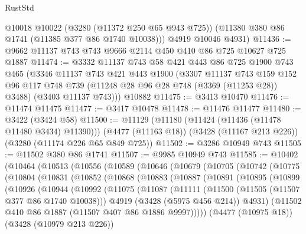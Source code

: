 \begin{lexlean}{RustStd}
\begin{coremodule}
        @10018
        @10022
        (@3280 (@11372 @250 @65 @943 @725))
        (@11380 @380 @86 @1741 (@11385 @377 @86 @1740 @10038)))
      @4919
      @10046
      @4931)
@11436 := @9662 @11137 @743 @743 @9666 @2114 @450 @410 @86 @725 @10627 @725 @1887
@11474 := @3332
    @11137
    @743
    @58
    @421
    @443
    @86
    @725
    @1900
    @743
    @465
    (@3346
      @11137
      @743
      @421
      @443
      @1900
      (@3307
        @11137
        @743
        @159
        @152
        @96
        @117
        @748
        @739
        (@11248 @28 @96 @28 @748 (@3369 (@11253 @28)) @3488)
        (@3403 @11137 @743)))
    @10882
@11475 := @3413 @10470
@11476 := @11474 @11475
@11477 := @3417 @10478
@11478 := @11476 @11477
@11480 := @3422 (@3424 @58)
@11500 := @11129
    (@11180 (@11424 (@11436 (@11478 @11480 @3434) @11390)))
    (@4477 (@11163 @18))
    (@3428 (@11167 @213 @226))
    (@3280 (@11174 @226 @65 @849 @725))
@11502 := @3286 @10949 @743
@11505 := @11502 @380 @86 @1741
@11507 := @9985 @10949 @743
@11585 := @10402
    (@10464
      (@10513
        (@10556
          (@10589
            (@10646
              (@10679
                (@10705
                  (@10742
                    (@10775
                      (@10804
                        (@10831
                          (@10852
                            (@10868
                              (@10883
                                (@10887
                                  (@10891
                                    (@10895
                                      (@10899
                                        (@10926
                                          (@10944
                                            (@10992
                                              (@11075
                                                (@11087
                                                  (@11111
                                                    (@11500 (@11505 (@11507 @377 @86 @1740 @10038)))
                                                    @4919
                                                    (@3428 (@5975 @456 @214))
                                                    @4931)
                                                  (@11502
                                                    @410
                                                    @86
                                                    @1887
                                                    (@11507 @407 @86 @1886 @9997)))))
                                            (@4477 (@10975 @18))
                                            (@3428 (@10979 @213 @226))

\end{coremodule}
\end{lexlean}
